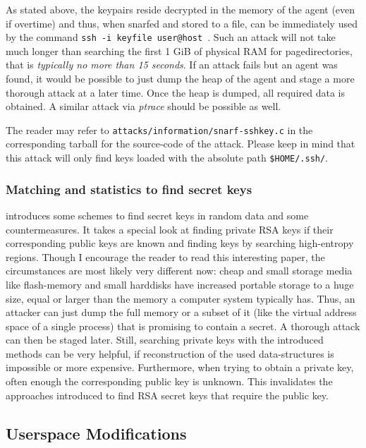 As stated above, the keypairs reside decrypted in the memory of the agent (even
if overtime) and thus, when snarfed and stored to a file, can be immediately
used by the command \texttt{ssh~-i~keyfile~user@host}~.  Such an attack will not
take much longer than searching the first 1 GiB of physical RAM for
pagedirectories, that is \emph{typically no more than 15 seconds}. If an attack
fails but an agent was found, it would be possible to just dump the heap of the
agent and stage a more thorough attack at a later time. Once the heap is dumped,
all required data is obtained. A similar attack via \emph{ptrace} should be
possible as well.

The reader may refer to \texttt{attacks/information/snarf-sshkey.c} in the
corresponding tarball for the source-code of the attack. Please keep in mind
that this attack will only find keys loaded with the absolute path
\texttt{\$HOME/.ssh/}.


\subsubsection{Matching and statistics to find secret keys}

\cite{hide_n_seek:1998} introduces some schemes to find secret keys in random
data and some countermeasures. It takes a special look at finding private RSA
keys if their corresponding public keys are known and finding keys by searching
high-entropy regions. Though I encourage the reader to read this interesting
paper, the circumstances are most likely very different now: cheap and small
storage media like flash-memory and small harddisks have increased portable
storage to a huge size, equal or larger than the memory a computer system
typically has. Thus, an attacker can just dump the full memory or a subset of it
(like the virtual address space of a single process) that is promising to
contain a secret. A thorough attack can then be staged later.  Still, searching
private keys with the introduced methods can be very helpful, if reconstruction
of the used data-structures is impossible or more expensive. Furthermore, when
trying to obtain a private key, often enough the corresponding public key is
unknown. This invalidates the approaches introduced to find RSA secret keys that
require the public key.




\subsection{Userspace Modifications}

